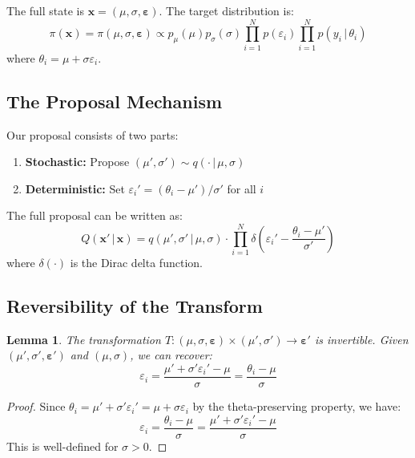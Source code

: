 \documentclass[11pt,a4paper]{article}
\newtheorem{lemma}[theorem]{Lemma}
\theoremstyle{definition}
\newcommand{\eps}{\varepsilon}
\newcommand{\given}{\,|\,}
\begin{document}
The full state is $\bm{x} = (\mu, \sigma, \bm{\eps})$. The target distribution is:
\begin{equation}
    \pi(\bm{x}) = \pi(\mu, \sigma, \bm{\eps}) \propto p_\mu(\mu) p_\sigma(\sigma)
    \prod_{i=1}^N p(\eps_i) \prod_{i=1}^N p(y_i \given \theta_i)
\end{equation}
where $\theta_i = \mu + \sigma \eps_i$.

\subsection{The Proposal Mechanism}

Our proposal consists of two parts:
\begin{enumerate}
    \item \textbf{Stochastic:} Propose $(\mu', \sigma') \sim q(\cdot \given \mu, \sigma)$
    \item \textbf{Deterministic:} Set $\eps_i' = (\theta_i - \mu')/\sigma'$ for all $i$
\end{enumerate}

The full proposal can be written as:
\begin{equation}
    Q(\bm{x}' \given \bm{x}) = q(\mu', \sigma' \given \mu, \sigma) \cdot
    \prod_{i=1}^N \delta\left(\eps_i' - \frac{\theta_i - \mu'}{\sigma'}\right)
\end{equation}
where $\delta(\cdot)$ is the Dirac delta function.

\subsection{Reversibility of the Transform}

\begin{lemma}
The transformation $T: (\mu, \sigma, \bm{\eps}) \times (\mu', \sigma') \to \bm{\eps}'$
is invertible. Given $(\mu', \sigma', \bm{\eps}')$ and $(\mu, \sigma)$, we can recover:
\begin{equation}
    \eps_i = \frac{\mu' + \sigma' \eps_i' - \mu}{\sigma} = \frac{\theta_i - \mu}{\sigma}
\end{equation}
\end{lemma}

\begin{proof}
Since $\theta_i = \mu' + \sigma' \eps_i' = \mu + \sigma \eps_i$ by the theta-preserving
property, we have:
\begin{equation}
    \eps_i = \frac{\theta_i - \mu}{\sigma} = \frac{\mu' + \sigma' \eps_i' - \mu}{\sigma}
\end{equation}
This is well-defined for $\sigma > 0$.
\end{proof}
\end{document}
